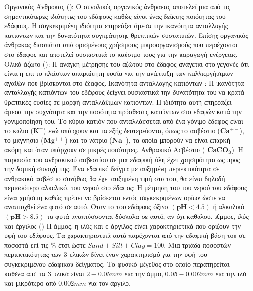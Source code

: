 \begin{outline}
    \1 Οργανικός Άνθρακας (): Ο συνολικός οργανικός άνθρακας αποτελεί μια από τις σημαντικότερες ιδιότητες του εδάφους καθώς είναι ένας δείκτης ποιότητας του εδάφους. Η συγκεκριμένη ιδιότητα επηρεάζει άμεσα την ικανότητα ανταλλαγής κατιόντων και την δυνατότητα συγκράτησης θρεπτικών συστατικών. Επίσης οργανικός άνθρακας διασπάται από ορισμένους χρήσιμους μικροοργανισμούς που περιέχονται στο έδαφος και αποτελεί ουσιαστικά το καύσιμο τους για την παραγωγή ενέργειας.
    \1 Ολικό άζωτο ():  Η ανάγκη μέτρησης του αζώτου στο έδαφος ανάγεται στο γεγονός ότι είναι η επι το πλείστων απαραίτητη ουσία για την ανάπτυξη των καλλιεργήσιμων αγαθών που βρίσκονται στο έδαφος.
    \1 Ικανότητα ανταλλαγής κατιόντων : Η ικανότητα ανταλλαγής κατιόντων του εδάφους δείχνει ουσιαστικά την δυνατότητα του να κρατά θρεπτικές ουσίες σε μορφή ανταλλάξιμων κατιόντων. Η ιδιότητα αυτή επηρεάζει άμεσα την συχνότητα και την ποσότητα πρόσθεσης κατιόντων στο εδαφών κατά την γονιμοποίηση του. Το κύριο κατιόν που ανταλλάσσεται από ένα γόνιμο έδαφος είναι το κάλιο ($\mathbf{K^+}$) ενώ υπάρχουν και τα εξής δευτερεύοντα, όπως το ασβέστιο ($\mathbf{Ca^{++}}$), το μαγνήσιο ($\mathbf{Mg^{++}}$) και το νάτριο ($\mathbf{Na^+}$), τα οποία μπορούν να είναι επαρκή ακόμη και όταν υπάρχουν σε μικρές ποσότητες.
    \1 Ανθρακικό Ασβέστιο ( $\mathbf{CaCO_3}$): Η παρουσία του ανθρακικού ασβεστίου σε μια εδαφική ύλη έχει χρησιμότητα ως προς την δομική συνοχή της. Ένα εδαφικό δείγμα με αυξημένη περιεκτικότητα σε ανθρακικό ασβέστιο συνήθως θα έχει αυξημένη τιμή στο  του, θα είναι δηλαδή περισσότερο αλκαλικό.
    \1  του νερού στο έδαφος: Η μέτρηση του  του νερού του εδάφους είναι χρήσιμη καθώς πρέπει να βρίσκεται εντός συγκεκριμένων ορίων ώστε να αναπτυχθεί ένα φυτό σε αυτό. Όταν το  του εδάφους όξινο $(\mathbf{pH<4.5})$ ή αλκαλικό $(\mathbf{pH>8.5})$ τα φυτά αναπτύσσονται δύσκολα σε αυτό, αν όχι καθόλου.
    \1 Άμμος, ιλύς και άργιλος () Η άμμος, η ιλύς και ο άργιλος είναι χαρακτηριστικά που ορίζουν την υφή του εδάφους. Τα χαρακτηριστικά αυτά παρέχονται από την εδαφική βάση του  σε ποσοστά επί τις \% έτσι ώστε $Sand+Silt+Clay=100$. Μια τριάδα ποσοστών περιεκτικότητας των 3 υλικών δίνει έναν χαρακτηρισμό για την υφή του συγκεκριμένου εδαφικού δείγματος. Το φυσικό μέγεθος στο οποίο παρατηρείται καθένα από τα 3 υλικά είναι $2-0.05mm$ για την άμμο, $0.05-0.002mm$ για την ιλύ και μικρότερο από $0.002mm$ για τον άργιλο.

\end{outline}
